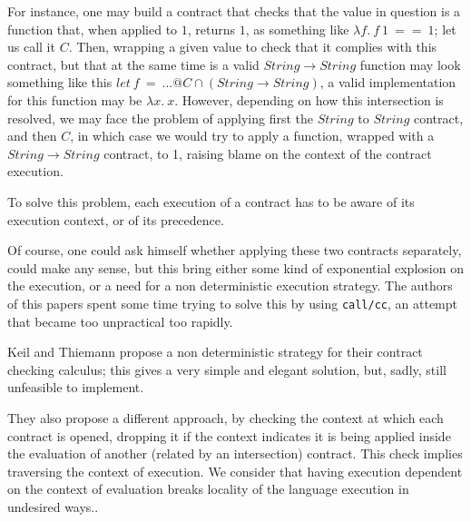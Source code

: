 For instance, one may build a contract that checks that the value in question is a
function that, when applied to $1$, returns $1$, as something like
$\lambda f.~f~1~==~1$; let us call it $C$.
Then, wrapping a given value to check that it complies with this contract, but that at
the same time is a valid $String \rightarrow String$ function may look something like this
$let~f~=~...@C \cap (String \rightarrow String)$, a valid implementation for this function
may be $\lambda x.~x$.
However, depending on how this intersection is resolved, we may face the problem of applying first
the $String$ to $String$ contract, and then $C$, in which case we would try to apply a function,
wrapped with a $String \rightarrow String$ contract, to 1, raising blame on the context
of the contract execution.

To solve this problem, each execution of a contract has to be aware of its execution context,
or of its precedence.




Of course, one could ask himself whether applying these two contracts separately,
could make any sense, but this bring either some kind of exponential explosion
on the execution, or a need for a non deterministic execution
strategy.
The authors of this papers spent some time trying to solve this by using
\texttt{call/cc}, an attempt that became too unpractical too rapidly.

Keil and Thiemann propose a non deterministic strategy for their contract checking
calculus; this gives a very simple and elegant solution, but, sadly, still
unfeasible to implement.

They also propose a different approach, by checking the context at which
each contract is opened, dropping
it if the context indicates it is being applied inside the evaluation of another
(related by an intersection) contract.
This check implies traversing the context of execution.
We consider that having execution dependent on the context
of evaluation breaks locality of
the language execution in undesired ways..

